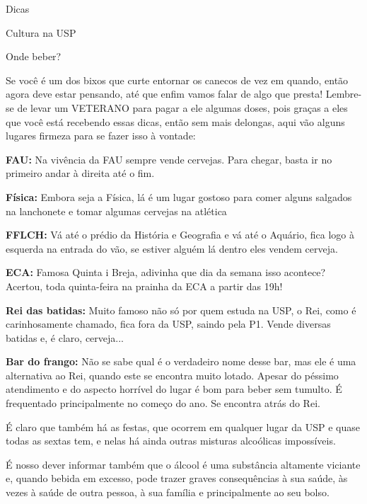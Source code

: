 \begin{secao}{Dicas}
\begin{subsecao}{Cultura na USP}
\end{subsecao}

\begin{subsecao}{Onde beber?}

Se você é um dos bixos que curte entornar os canecos de vez em quando, então agora
deve estar pensando, até que enfim vamos falar de algo que presta! Lembre-se de
levar um VETERANO para pagar a ele algumas doses, pois graças a eles que você
está recebendo essas dicas, então sem mais delongas, aqui vão alguns lugares
firmeza para se fazer isso à vontade:

{\bf FAU:} Na vivência da FAU sempre vende cervejas. Para chegar, basta ir no primeiro andar à direita até o fim.

{\bf Física:} Embora seja a Física, lá é um lugar gostoso para comer alguns
salgados na lanchonete e tomar algumas cervejas na atlética

{\bf FFLCH:} Vá até o prédio da História e Geografia e vá até o Aquário, fica logo à esquerda na entrada do vão, se estiver alguém lá dentro eles vendem cerveja.

{\bf ECA:} Famosa Quinta i Breja, adivinha que dia da semana isso acontece?
Acertou, toda quinta-feira na prainha da ECA a partir das 19h!

{\bf Rei das batidas:} Muito famoso não só por quem estuda na USP, o Rei,
como é carinhosamente chamado, fica fora da USP, saindo pela P1. Vende
diversas batidas e, é claro, cerveja...

{\bf Bar do frango:} Não se sabe qual é o verdadeiro nome desse bar, mas ele é
uma alternativa ao Rei, quando este se encontra muito lotado. Apesar do péssimo atendimento e do aspecto horrível do lugar é bom para beber sem
tumulto. É frequentado principalmente no começo do ano. Se encontra atrás do
Rei.

É claro que também há as festas, que ocorrem em qualquer lugar da USP e quase todas as sextas tem, e nelas
há ainda outras misturas alcoólicas impossíveis.

É nosso dever informar também que o álcool é uma substância altamente viciante
e, quando bebida em excesso, pode trazer graves consequências à sua saúde, às
vezes à saúde de outra pessoa, à sua família e principalmente ao seu bolso.

\end{subsecao}
\end{secao}
